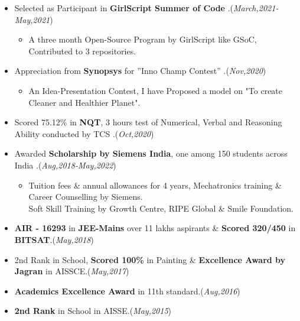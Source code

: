\documentclass[10pt]{extarticle}
\begin{document}
    \begin{itemize}
       \item Selected as Participant in \textbf{GirlScript Summer of Code} \href{https://drive.google.com/file/d/1ZPpka9NOeBD6NCzFUj0QpU1cj0x05qnG/view?usp=sharing}{\color{blue}\faArrowCircleRight}.\hfill\hfill(\textit{March,2021-May,2021})
           \begin{itemize}
               \item A three month Open-Source Program by GirlScript like GSoC, Contributed to 3 repositories.
           \end{itemize}
        \item Appreciation from \textbf{Synopsys} for ”Inno Champ Contest” \href{https://drive.google.com/file/d/1Zv0M_kMdqlZwq2BzI__InScP3grGPLfp/view?usp=sharing}{\color{blue}\faArrowCircleRight}.\hfill\hfill(\textit{Nov,2020})
          \begin{itemize}
              \item An Idea-Presentation Contest, I have Proposed a model on "To create Cleaner and Healthier Planet".
          \end{itemize}
       \item Scored 75.12\% in \textbf{NQT}, 3 hours test of Numerical, Verbal and Reasoning Ability conducted by TCS \href{https://drive.google.com/file/d/1FfOOm94LawOPaGOGxPQHwiO4TyZkc5h6/view?usp=sharing}{\color{blue}\faArrowCircleRight}.\hfill\hfill(\textit{Oct,2020})
       \item Awarded \textbf{Scholarship by Siemens India}, one among 150 students across India \href{https://drive.google.com/file/d/1XFUYs_kH-7Q7BmaebOLJVNOLyD0d4iTg/view?usp=sharing}{\color{blue}\faArrowCircleRight}.\hfill\hfill(\textit{Aug,2018-May,2022})
          \begin{itemize}
            \item Tuition fees \& annual allowances for 4 years, Mechatronics training \& Career Counselling by Siemens.\\
            Soft Skill Training by Growth Centre, RIPE Global \& Smile Foundation.
          \end{itemize}
      \item \textbf{AIR - 16293} in \textbf{JEE-Mains} over 11 lakhs aspirants \& \textbf{Scored 320/450} in \textbf{BITSAT}.\hfill\hfill(\textit{May,2018})
      \item 2nd Rank in School, \textbf{Scored 100\%} in Painting \& \textbf{Excellence Award by Jagran} in AISSCE.\hfill\hfill(\textit{May,2017})
      \item \textbf{Academics Excellence Award} in 11th standard.\hfill\hfill(\textit{Aug,2016})
      \item \textbf{2nd Rank} in School in AISSE.\hfill\hfill(\textit{May,2015})
    \end{itemize}
\end{document}
